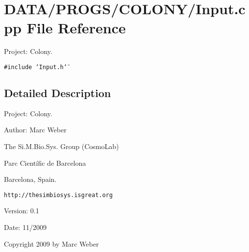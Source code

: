 \section{DATA/PROGS/COLONY/Input.cpp File Reference}
\label{Input_8cpp}
Project: Colony. 

{\tt \#include \char`\"{}Input.h\char`\"{}}\par


\subsection{Detailed Description}
Project: Colony. 

\begin{Desc}
\item[Author:]Marc Weber\par
 The Si.M.Bio.Sys. Group (CosmoLab)\par
 Parc Científic de Barcelona\par
 Barcelona, Spain.\par
 {\tt http://thesimbiosys.isgreat.org} \end{Desc}
\begin{Desc}
\item[Version:]0.1 \end{Desc}
\begin{Desc}
\item[Date:]11/2009\end{Desc}
Copyright 2009 by Marc Weber 